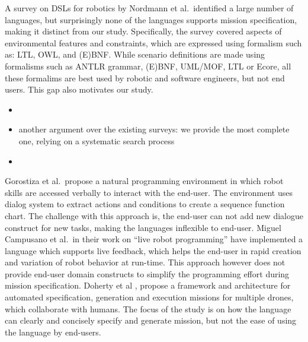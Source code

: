 A survey on DSLs for robotics by Nordmann et al.\,\cite{Nordmann2016a} identified a large number of languages, but surprisingly none of the languages supports mission specification, making it distinct from our study.
Specifically, the survey covered aspects of environmental features and constraints, which are expressed using formalism such as: LTL, OWL, and (E)BNF. While scenario definitions are made using formalisms such as ANTLR grammar, (E)BNF, UML/MOF, LTL or Ecore, all these formalims are best used by robotic and software engineers, but not end users. This gap also motivates our study.

\begin{itemize}
	\item \citet{bacca.ea:2017:teachingrobots} 
	\item another argument over the existing surveys: we provide the most complete one, relying on a systematic search process
	\item 
\end{itemize}


Gorostiza et al.\,\cite{Gorostiza2011} propose a natural programming environment in which robot skills are accessed verbally to interact with the end-user. The environment uses dialog system to extract actions and conditions to create a sequence function chart. The challenge with this approach is, the end-user can not add new dialogue construct for new tasks, making the languages inflexible to end-user.
Miguel Campusano et al.\,\cite{campusano.ea:2017:live} in their work on ``live robot programming'' have implemented a language which supports live  feedback, which helps the end-user in rapid creation and variation of robot behavior at run-time. This approach however does not provide end-user domain constructs to simplify the programming effort during mission specification. Doherty et al \cite{Doherty2013}, propose a framework and architecture for automated specification, generation and execution missions for multiple drones, which collaborate with humans. The focus of the study is on how the language can clearly and concisely specify and generate mission, but not the ease of using the language by end-users.

